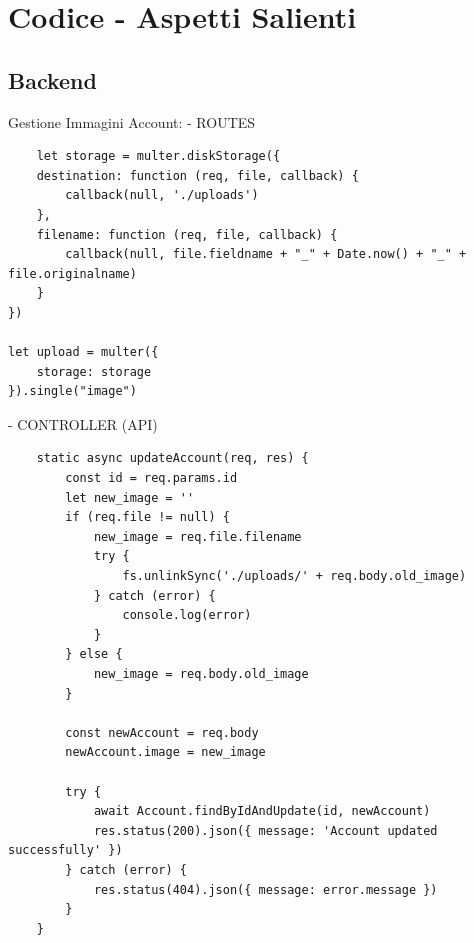 \documentclass{report}
\begin{document}
\newpage

\section{Codice - Aspetti Salienti}
\subsection{Backend}
Gestione Immagini Account:
\newline
- ROUTES
\begin{lstlisting}
    let storage = multer.diskStorage({
    destination: function (req, file, callback) {
        callback(null, './uploads')
    },
    filename: function (req, file, callback) {
        callback(null, file.fieldname + "_" + Date.now() + "_" + file.originalname)
    }
})

let upload = multer({
    storage: storage
}).single("image")
\end{lstlisting}
- CONTROLLER (API)
\begin{lstlisting}
    static async updateAccount(req, res) {
        const id = req.params.id
        let new_image = ''
        if (req.file != null) {
            new_image = req.file.filename
            try {
                fs.unlinkSync('./uploads/' + req.body.old_image)
            } catch (error) {
                console.log(error)
            }
        } else {
            new_image = req.body.old_image
        }

        const newAccount = req.body
        newAccount.image = new_image

        try {
            await Account.findByIdAndUpdate(id, newAccount)
            res.status(200).json({ message: 'Account updated successfully' })
        } catch (error) {
            res.status(404).json({ message: error.message })
        }
    }
\end{lstlisting}
\end{document}
